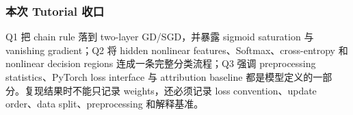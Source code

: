 \subsubsection*{本次 Tutorial 收口}

Q1 把 chain rule 落到 two-layer GD/SGD，并暴露 sigmoid saturation 与 vanishing gradient；Q2 将 hidden nonlinear features、Softmax、cross-entropy 和 nonlinear decision regions 连成一条完整分类流程；Q3 强调 preprocessing statistics、PyTorch loss interface 与 attribution baseline 都是模型定义的一部分。复现结果时不能只记录 weights，还必须记录 loss convention、update order、data split、preprocessing 和解释基准。
